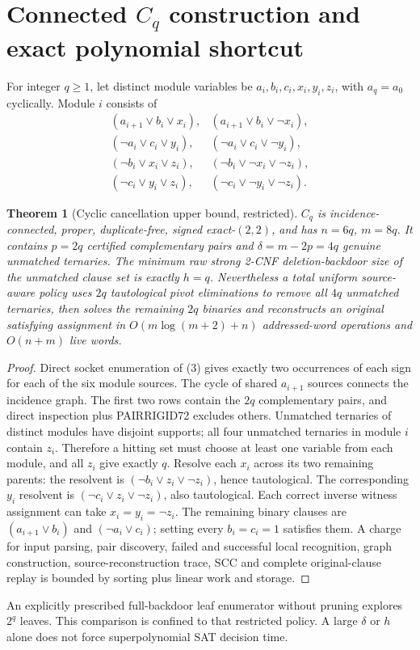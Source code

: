 \documentclass[11pt]{article}
\newtheorem{theorem}{Theorem}
\begin{document}
\section{Connected $C_q$ construction and exact polynomial shortcut}
For integer $q\ge1$, let distinct module variables be $a_i,b_i,c_i,x_i,y_i,z_i$, with $a_q=a_0$ cyclically. Module $i$ consists of
\[
\begin{array}{rl}
(a_{i+1}\vee b_i\vee x_i),&(a_{i+1}\vee b_i\vee\neg x_i),\\
(\neg a_i\vee c_i\vee y_i),&(\neg a_i\vee c_i\vee\neg y_i),\\
(\neg b_i\vee x_i\vee z_i),&(\neg b_i\vee\neg x_i\vee\neg z_i),\\
(\neg c_i\vee y_i\vee z_i),&(\neg c_i\vee\neg y_i\vee\neg z_i).
\end{array} \tag{3}
\]
\begin{theorem}[Cyclic cancellation upper bound, restricted]
$C_q$ is incidence-connected, proper, duplicate-free, signed exact-$(2,2)$, and has $n=6q$, $m=8q$. It contains $p=2q$ certified complementary pairs and $\delta=m-2p=4q$ genuine unmatched ternaries. The minimum raw strong 2-CNF deletion-backdoor size of the unmatched clause set is exactly $h=q$. Nevertheless a total uniform source-aware policy uses $2q$ tautological pivot eliminations to remove all $4q$ unmatched ternaries, then solves the remaining $2q$ binaries and reconstructs an original satisfying assignment in $O(m\log(m+2)+n)$ addressed-word operations and $O(n+m)$ live words.
\end{theorem}
\begin{proof}
Direct socket enumeration of (3) gives exactly two occurrences of each sign for each of the six module sources. The cycle of shared $a_{i+1}$ sources connects the incidence graph. The first two rows contain the $2q$ complementary pairs, and direct inspection plus PAIRRIGID72 excludes others. Unmatched ternaries of distinct modules have disjoint supports; all four unmatched ternaries in module $i$ contain $z_i$. Therefore a hitting set must choose at least one variable from each module, and all $z_i$ give exactly $q$.
Resolve each $x_i$ across its two remaining parents: the resolvent is $(\neg b_i\vee z_i\vee\neg z_i)$, hence tautological. The corresponding $y_i$ resolvent is $(\neg c_i\vee z_i\vee\neg z_i)$, also tautological. Each correct inverse witness assignment can take $x_i=y_i=\neg z_i$. The remaining binary clauses are $(a_{i+1}\vee b_i)$ and $(\neg a_i\vee c_i)$; setting every $b_i=c_i=1$ satisfies them. A charge for input parsing, pair discovery, failed and successful local recognition, graph construction, source-reconstruction trace, SCC and complete original-clause replay is bounded by sorting plus linear work and storage.
\end{proof}
An explicitly prescribed full-backdoor leaf enumerator without pruning explores $2^q$ leaves. This comparison is confined to that restricted policy. A large $\delta$ or $h$ alone does not force superpolynomial SAT decision time.
\end{document}
